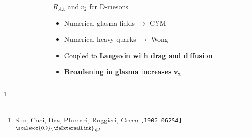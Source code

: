 \documentclass[aspectratio=169,11pt,usenames,dvipsnames]{beamer}
\renewcommand{\thefootnote}{\color{customblue}\faPaperPlaneO}
\newcommand\blfootnote[1]{%
  \begingroup
  \renewcommand\thefootnote{}\footnote{#1}%
  \addtocounter{footnote}{-1}%
  \endgroup
}
\begin{document}
\begin{frame}[t]
\begin{columns}[onlytextwidth,t]
\begin{figure}
        \end{figure}
        \begin{center}
            {\Large\color{isgold} $R_{AA}$ and $v_2$ for D-mesons \\[10pt]}
            \footnotesize
                \begin{itemize}
                    \item {\color{lightgray}Numerical glasma fields $\rightarrow$ CYM}
                    \item {\color{lightgray}Numerical heavy quarks $\rightarrow$ Wong}
                    \item {\color{lightgray}Coupled to {\bfseries Langevin with drag and diffusion}}\\[15pt]
                    \item {\color{destacado}\bfseries\normalsize{Broadening in glasma increases $\boldsymbol{v_2}$}}
                \end{itemize}
        \end{center}
    \end{columns}
    \blfootnote{\scriptsize Sun, Coci, Das, Plumari, Ruggieri, Greco \href{https://arxiv.org/abs/1902.06254}{\color{palgold}\texttt{[1902.06254]}$^\text{\scalebox{0.9}{\faExternalLink}}$}}
\end{frame}

\end{document}

